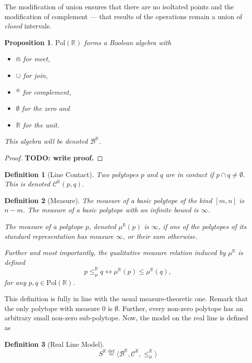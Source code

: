 \documentclass{article}
\newtheorem*{definition}{Definition}
\newtheorem*{proposition}{Proposition}
\newcommand{\R}{\mathbb{R}}
\newcommand{\B}{\mathcal{B}}
\newcommand{\bcup}{\cup}
\newcommand{\bcap}{\Cap}
\newcommand{\bstar}{^\circledast}
\newcommand{\bcont}{\mathcal{C}^\R}
\newcommand{\bmeasure}{\leq_\mu^\R}
\newcommand{\Pol}{\text{Pol}}
\newcommand{\eqdef}{\stackrel{\text{def}}{=}}
\begin{document}
The modification of union ensures that there are no isoltated points and the modification of complement --- that results of the operations remain a union of \emph{closed} intervals.

\begin{proposition}
$\Pol(\R)$ forms a Boolean algebra with
\begin{itemize}
  \item $\bcap$ for meet,
  \item $\bcup$ for join,
  \item $\bstar$ for complement,
  \item $\emptyset$ for the zero and
  \item $\R$ for the unit.
\end{itemize}
This algebra will be denoted $\B^\R$.
\end{proposition}
\begin{proof}
  \textbf{TODO: write proof.}
\end{proof}

\begin{definition}[Line Contact]
Two polytopes $p$ and $q$ are \emph{in contact} if $p \cap q \neq \emptyset$. This is denoted $\bcont(p, q)$.
\end{definition}

\begin{definition}[Measure]
  The measure of a basic polytope of the kind $[m, n]$ is $n-m$. The measure of a basic polytope with an infinite bound is $\infty$.

  The \emph{measure} of a polytope $p$, denoted $\mu^\R(p)$ is $\infty$, if one of the polytopes of its standard representation has measure $\infty$, or their sum otherwise.

Further and most importantly, the \emph{qualitative measure relation induced by} $\mu^\R$ is defined
\begin{equation*}
  p \bmeasure q \longleftrightarrow \mu^\R(p) \leq \mu^\R(q),
\end{equation*}
  for any $p, q \in \Pol(\R)$.
\end{definition}

This definition is fully in line with the usual measure-theoretic one. Remark that the only polytope with measure $0$ is $\emptyset$. Further, every non-zero polytope has an arbitrary small non-zero sub-polytope.
Now, the model on the real line is defined as
\begin{definition}[Real Line Model]
  \begin{equation*}
    S^\R \eqdef \langle \B^\R, \bcont, \bmeasure \rangle
  \end{equation*}
\end{definition}
\end{document}
